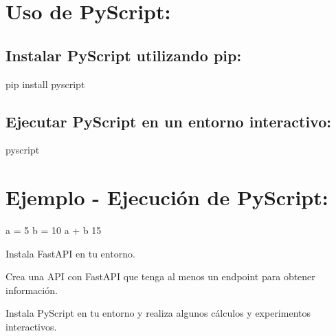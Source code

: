 \documentclass[
  a4paper,
  onepage,
  openany]{scrreprt}
\newenvironment{Shaded}{\begin{snugshade}}{\end{snugshade}}
\newcommand{\DecValTok}[1]{\textcolor[rgb]{0.68,0.00,0.00}{#1}}
\newcommand{\ExtensionTok}[1]{\textcolor[rgb]{0.00,0.23,0.31}{#1}}
\newcommand{\NormalTok}[1]{\textcolor[rgb]{0.00,0.23,0.31}{#1}}
\newcommand{\OperatorTok}[1]{\textcolor[rgb]{0.37,0.37,0.37}{#1}}
\begin{document}
\hypertarget{uso-de-pyscript}{%
\section{Uso de PyScript:}\label{uso-de-pyscript}}

\hypertarget{instalar-pyscript-utilizando-pip}{%
\subsection{Instalar PyScript utilizando
pip:}\label{instalar-pyscript-utilizando-pip}}

\begin{Shaded}
\begin{Highlighting}[]
\ExtensionTok{pip}\NormalTok{ install pyscript}
\end{Highlighting}
\end{Shaded}

\hypertarget{ejecutar-pyscript-en-un-entorno-interactivo}{%
\subsection{Ejecutar PyScript en un entorno
interactivo:}\label{ejecutar-pyscript-en-un-entorno-interactivo}}

\begin{Shaded}
\begin{Highlighting}[]
\ExtensionTok{pyscript}
\end{Highlighting}
\end{Shaded}

\hypertarget{ejemplo---ejecuciuxf3n-de-pyscript}{%
\section{Ejemplo - Ejecución de
PyScript:}\label{ejemplo---ejecuciuxf3n-de-pyscript}}

\begin{Shaded}
\begin{Highlighting}[]
\NormalTok{a }\OperatorTok{=} \DecValTok{5}
\NormalTok{b }\OperatorTok{=} \DecValTok{10}
\NormalTok{a }\OperatorTok{+}\NormalTok{ b}
\DecValTok{15}
\end{Highlighting}
\end{Shaded}

\begin{tcolorbox}[enhanced jigsaw, breakable, opacityback=0, toptitle=1mm, coltitle=black, toprule=.15mm, rightrule=.15mm, colframe=quarto-callout-important-color-frame, opacitybacktitle=0.6, arc=.35mm, title=\textcolor{quarto-callout-important-color}{\faExclamation}\hspace{0.5em}{Actividad Práctica:}, titlerule=0mm, colbacktitle=quarto-callout-important-color!10!white, bottomtitle=1mm, bottomrule=.15mm, colback=white, left=2mm, leftrule=.75mm]

Instala FastAPI en tu entorno.

Crea una API con FastAPI que tenga al menos un endpoint para obtener
información.

Instala PyScript en tu entorno y realiza algunos cálculos y experimentos
interactivos.

\end{tcolorbox}
\end{document}
